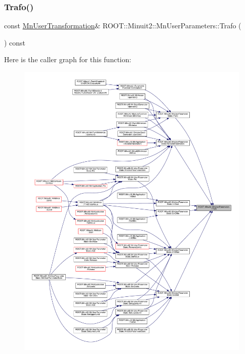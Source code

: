 \mbox{\label{classROOT_1_1Minuit2_1_1MnUserParameters_ac5c3bff96b6fc41a790005f524e334db}} 
\subsubsection{\texorpdfstring{Trafo()}{Trafo()}\hspace{0.1cm}{\footnotesize\ttfamily [2/3]}}
{\footnotesize\ttfamily const \mbox{\hyperlink{classROOT_1_1Minuit2_1_1MnUserTransformation}{Mn\+User\+Transformation}}\& R\+O\+O\+T\+::\+Minuit2\+::\+Mn\+User\+Parameters\+::\+Trafo (\begin{DoxyParamCaption}{ }\end{DoxyParamCaption}) const\hspace{0.3cm}{\ttfamily [inline]}}

Here is the caller graph for this function\+:
\nopagebreak
\begin{figure}[H]
\begin{center}
\leavevmode
\includegraphics[width=350pt]{d6/d10/classROOT_1_1Minuit2_1_1MnUserParameters_ac5c3bff96b6fc41a790005f524e334db_icgraph}
\end{center}
\end{figure}
\mbox{\label{classROOT_1_1Minuit2_1_1MnUserParameters_ac5c3bff96b6fc41a790005f524e334db}} 
